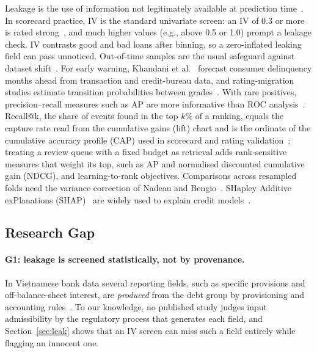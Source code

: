 \documentclass[runningheads]{llncs}
\begin{document}
Leakage is the use of information not legitimately available at prediction time~\cite{kaufman2012leakage}. In scorecard practice, IV is the standard univariate screen: an IV of 0.3 or more is rated strong~\cite{siddiqi2006credit}, and much higher values (e.g., above 0.5 or 1.0) prompt a leakage check. IV contrasts good and bad loans after binning, so a zero-inflated leaking field can pass unnoticed. Out-of-time samples are the usual safeguard against dataset shift~\cite{siddiqi2006credit,morenotorres2012unifying}. For early warning, Khandani et al.~\cite{khandani2010consumer} forecast consumer delinquency months ahead from transaction and credit-bureau data, and rating-migration studies estimate transition probabilities between grades~\cite{lando2002analyzing}. With rare positives, precision--recall measures such as AP are more informative than ROC analysis~\cite{saito2015precision}. Recall@k, the share of events found in the top $k\%$ of a ranking, equals the capture rate read from the cumulative gains (lift) chart and is the ordinate of the cumulative accuracy profile (CAP) used in scorecard and rating validation~\cite{siddiqi2006credit,engelmann2003testing}; treating a review queue with a fixed budget as retrieval adds rank-sensitive measures that weight its top, such as AP and normalised discounted cumulative gain (NDCG), and learning-to-rank objectives. Comparisons across resampled folds need the variance correction of Nadeau and Bengio~\cite{nadeau2003inference}. SHapley Additive exPlanations (SHAP)~\cite{lundberg2017unified,lundberg2020tree} are widely used to explain credit models~\cite{bussmann2021explainable}.

\subsection{Research Gap}
\label{sec:gap}

\paragraph{G1: leakage is screened statistically, not by provenance.} In Vietnamese bank data several reporting fields, such as specific provisions and off-balance-sheet interest, are \emph{produced} from the debt group by provisioning and accounting rules~\cite{gov2024nd86,gov2025nd135}. To our knowledge, no published study judges input admissibility by the regulatory process that generates each field, and Section~\ref{sec:leak} shows that an IV screen can miss such a field entirely while flagging an innocent one.
\end{document}
